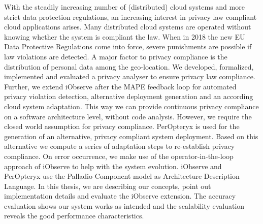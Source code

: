 
\Abstract

With the steadily increasing number of (distributed) cloud systems and more strict data protection regulations, an increasing interest in privacy law compliant cloud applications arises. Many distributed cloud systems are operated without knowing whether the system is compliant the law. When in 2018 the new EU Data Protective Regulations come into force, severe punishments are possible if law violations are detected. A major factor to privacy compliance is the distribution of personal data among the geo-location. We developed, formalized, implemented and evaluated a privacy analyser to ensure privacy law compliance. Further, we extend iObserve after the MAPE feedback loop for automated privacy violation detection, alternative deployment generation and an according cloud system adaptation. This way we can provide continuous privacy compliance on a software architecture level, without code analysis. However, we require the closed world assumption for privacy compliance. PerOpteryx is used for the generation of an alternative, privacy compliant system deployment. Based on this alternative we compute a series of adaptation steps to re-establish privacy compliance. On error occurrence, we make use of the operator-in-the-loop approach of iObserve to help with the system evolution. iObserve and PerOpteryx use the Palladio Component model as Architecture Description Language. In this thesis, we are describing our concepts, point out implementation details and evaluate the iObserve extension. The accuracy evaluation shows our system works as intended and the scalability evaluation reveals the good performance characteristics.